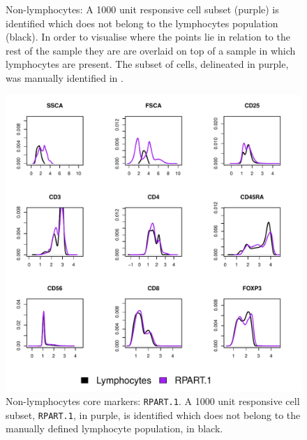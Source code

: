 \begin{figure}[!h]
\begin{minipage}{.6\textwidth}
\end{minipage}
\begin{minipage}{.3\textwidth}
{ Non-lymphocytes:  A 1000 unit responsive cell subset (purple) is identified which does not belong to the lymphocytes population (black).  }
{
In order to visualise where the points lie in relation to the rest of the sample they are are overlaid on top of a sample in which lymphocytes are present.
The subset of cells, delineated in purple, was manually identified in .
}
\end{minipage}
\end{figure}

\begin{figure}
  \centering
\begin{minipage}{.9\textwidth}
\includegraphics[width=\linewidth]{figures/rpart-nonlymphocytes-clusters}
{ Non-lymphocytes core markers: \texttt{RPART.1}. }
{
    A 1000 unit responsive cell subset, \texttt{RPART.1}, in purple, is identified which does not belong to the manually defined lymphocyte population, in black. 
}
\end{minipage}
\end{figure}

